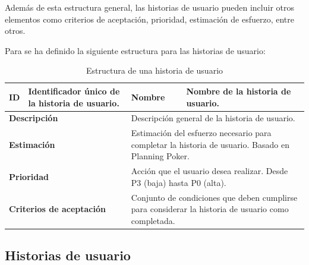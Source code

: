 Además de esta estructura general, las historias de usuario pueden incluir otros elementos como criterios de aceptación,
prioridad, estimación de esfuerzo, entre otros.

Para se ha definido la siguiente estructura para las historias de usuario:

\begin{table}[H]
    \centering
    \begin{tabular}{|p{2cm}|p{4cm}|p{2cm}|p{4cm}|}
        \hline
        \textbf{ID} & Identificador único de la historia de usuario. & \textbf{Nombre} & Nombre de la historia de usuario. \\
        \hline
        \multicolumn{2}{|p{6cm}|}{\textbf{Descripción}} & \multicolumn{2}{p{6cm}|}{Descripción general de la historia de usuario.} \\
        \hline
        \multicolumn{2}{|p{6cm}|}{\textbf{Estimación}} & \multicolumn{2}{p{6cm}|}{Estimación del esfuerzo necesario para completar la historia de usuario. Basado en Planning Poker.} \\
        \hline
        \multicolumn{2}{|p{6cm}|}{\textbf{Prioridad}} & \multicolumn{2}{p{6cm}|}{Acción que el usuario desea realizar. Desde P3 (baja) hasta P0 (alta).} \\
        \hline
        \multicolumn{2}{|p{6cm}|}{\textbf{Criterios de aceptación}} & \multicolumn{2}{p{6cm}|}{Conjunto de condiciones que deben cumplirse para considerar la historia de usuario como completada.} \\
        \hline
    \end{tabular}
    \caption{Estructura de una historia de usuario}
    \label{tab:estructura_historia_usuario}
\end{table}

\subsection{Historias de usuario}

